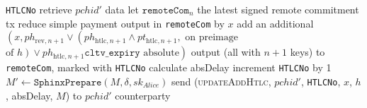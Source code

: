\begin{algorithmic}[1]
      \texttt{HTLCNo}
        \State retrieve $\mathit{pchid}'$ data
        \State let $\mathtt{remoteCom}_n$ the latest signed remote commitment tx
        \State reduce simple payment output in \texttt{remoteCom} by $x$
        \State add an additional $\left(x, ph_{\mathrm{rev}, n+1} \vee
        \left(ph_{\mathrm{htlc}, n+1} \wedge pt_{\mathrm{htlc}, n+1}, \text{ on
        preimage}\right.\right.$ $\left.\left.\text{of } h\right) \vee
        ph_{\mathrm{htlc}, n+1}\mathtt{cltv\_expiry} \text{ absolute}\right)$
        output (all with $n+1$ keys) to \texttt{remoteCom}, marked with
        \texttt{HTLCNo}
        \State calculate absDelay \TODO{}
        \State increment \texttt{HTLCNo} by 1
        \State $M' \gets \mathtt{SphinxPrepare}\left(M, \delta,
        sk_{\mathit{Alice}}\right)$
        \State send (\textsc{updateAddHtlc}, $\mathit{pchid}'$, \texttt{HTLCNo},
        $x$, $h$, absDelay, $M$) to $\mathit{pchid}'$ counterparty
      \EndIf
    \EndIndent
    \State


\end{algorithmic}
